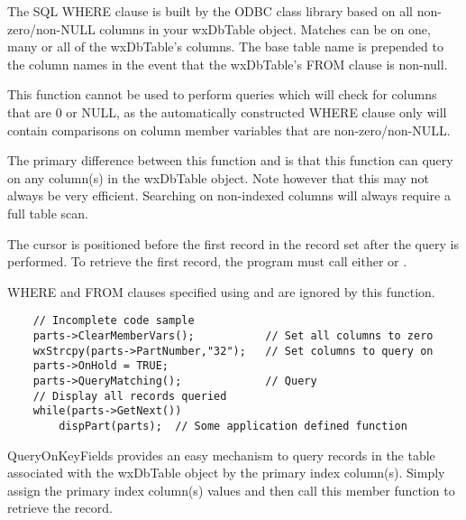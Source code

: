 
The SQL WHERE clause is built by the ODBC class library based on all
non-zero/non-NULL columns in your wxDbTable object.  Matches can be on one,
many or all of the wxDbTable's columns.  The base table name is prepended
to the column names in the event that the wxDbTable's FROM clause is non-null.

This function cannot be used to perform queries which will check for
columns that are 0 or NULL, as the automatically constructed WHERE clause
only will contain comparisons on column member variables that are
non-zero/non-NULL.

The primary difference between this function and 
is that this function can query on any column(s) in the wxDbTable object.
Note however that this may not always be very efficient.  Searching on
non-indexed columns will always require a full table scan.

The cursor is positioned before the first record in the record set after
the query is performed.  To retrieve the first record, the program must call
either  or
.

WHERE and FROM clauses specified using 
and  are ignored by
this function.


\begin{verbatim}
    // Incomplete code sample
    parts->ClearMemberVars();           // Set all columns to zero
    wxStrcpy(parts->PartNumber,"32");   // Set columns to query on
    parts->OnHold = TRUE;
    parts->QueryMatching();             // Query
    // Display all records queried
    while(parts->GetNext())
        dispPart(parts);  // Some application defined function
\end{verbatim}

\label{wxdbtablequeryonkeyfields}


QueryOnKeyFields provides an easy mechanism to query records in the table
associated with the wxDbTable object by the primary index column(s).  Simply
assign the primary index column(s) values and then call this member function
to retrieve the record.

